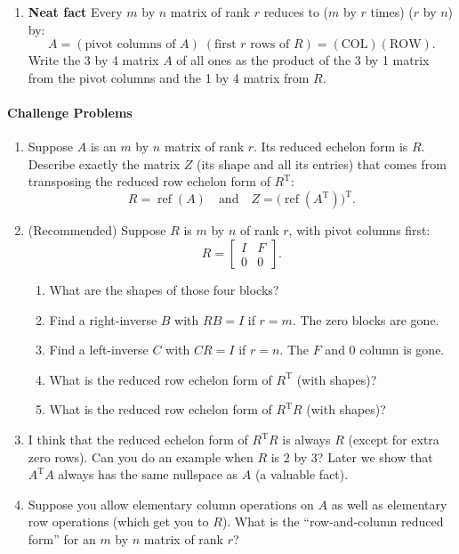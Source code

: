 \documentclass[14pt, a4paper]{article}
\begin{document}
\begin{enumerate}[resume]
    \item \textbf{Neat fact} Every $m$ by $n$ matrix of rank $r$ reduces to ($m$ by $r$ times) ($r$ by $n$) by:
          \[
              \boxed{A = (\text{pivot columns of } A) \; (\text{first } r \text{ rows of } R) = (\text{COL})(\text{ROW}).}
          \]
          Write the 3 by 4 matrix $A$ of all ones as the product of the 3 by 1 matrix from the pivot columns and the 1 by 4 matrix from $R$.
\end{enumerate}

\paragraph{Challenge Problems}
\begin{enumerate}[resume]
    \item Suppose $A$ is an $m$ by $n$ matrix of rank $r$. Its reduced echelon form is $R$. Describe exactly the matrix $Z$ (its shape and all its entries) that comes from transposing the reduced row echelon form of $R^{\mathrm{T}}$:
          \[
              R = \operatorname{ref}(A) \quad \text{and} \quad Z = \bigl(\operatorname{ref}(A^{\mathrm{T}})\bigr)^{\mathrm{T}}.
          \]

    \item (Recommended) Suppose $R$ is $m$ by $n$ of rank $r$, with pivot columns first:
          \[
              R = \begin{bmatrix} I & F \\ 0 & 0 \end{bmatrix}.
          \]
          \begin{enumerate}
              \item What are the shapes of those four blocks?
              \item Find a right-inverse $B$ with $RB = I$ if $r = m$. The zero blocks are gone.
              \item Find a left-inverse $C$ with $CR = I$ if $r = n$. The $F$ and $0$ column is gone.
              \item What is the reduced row echelon form of $R^{\mathrm{T}}$ (with shapes)?
              \item What is the reduced row echelon form of $R^{\mathrm{T}}R$ (with shapes)?
          \end{enumerate}

    \item I think that the reduced echelon form of $R^{\mathrm{T}}R$ is always $R$ (except for extra zero rows). Can you do an example when $R$ is $2$ by $3$? Later we show that $A^{\mathrm{T}}A$ always has the same nullspace as $A$ (a valuable fact).

    \item Suppose you allow elementary column operations on $A$ as well as elementary row operations (which get you to $R$). What is the ``row-and-column reduced form'' for an $m$ by $n$ matrix of rank $r$?
\end{enumerate}
\end{document}
